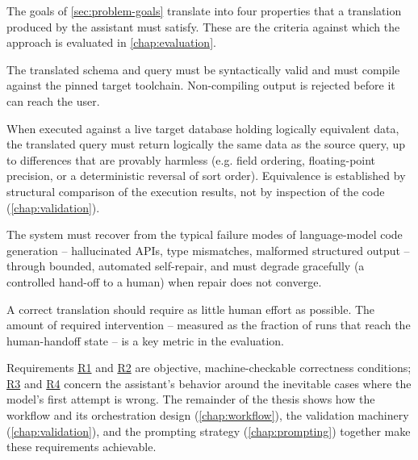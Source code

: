 The goals of \cref{sec:problem-goals} translate into four properties that a translation produced by the assistant must satisfy. These are the criteria against which the approach is evaluated in \cref{chap:evaluation}.

\begin{description}
  \label{desc:requirements-r1} \item[R1 -- Transformation correctness.] The translated schema and query must be syntactically valid and must compile against the pinned target toolchain. Non-compiling output is rejected before it can reach the user.

  \label{desc:requirements-r2} \item[R2 -- Semantic preservation.] When executed against a live target database holding logically equivalent data, the translated query must return logically the same data as the source query, up to differences that are provably harmless (e.g. field ordering, floating-point precision, or a deterministic reversal of sort order). Equivalence is established by structural comparison of the execution results, not by inspection of the code (\cref{chap:validation}).

  \label{desc:requirements-r3} \item[R3 -- Robustness.] The system must recover from the typical failure modes of language-model code generation -- hallucinated APIs, type mismatches, malformed structured output -- through bounded, automated self-repair, and must degrade gracefully (a controlled hand-off to a human) when repair does not converge.

  \label{desc:requirements-r4} \item[R4 -- Minimal manual intervention.] A correct translation should require as little human effort as possible. The amount of required intervention -- measured as the fraction of runs that reach the human-handoff state -- is a key metric in the evaluation.
\end{description}

Requirements \hyperref[desc:requirements-r1]{R1} and \hyperref[desc:requirements-r2]{R2} are objective, machine-checkable correctness conditions; \hyperref[desc:requirements-r3]{R3} and \hyperref[desc:requirements-r4]{R4} concern the assistant's behavior around the inevitable cases where the model's first attempt is wrong. The remainder of the thesis shows how the workflow and its orchestration design (\cref{chap:workflow}), the validation machinery (\cref{chap:validation}), and the prompting strategy (\cref{chap:prompting}) together make these requirements achievable.
